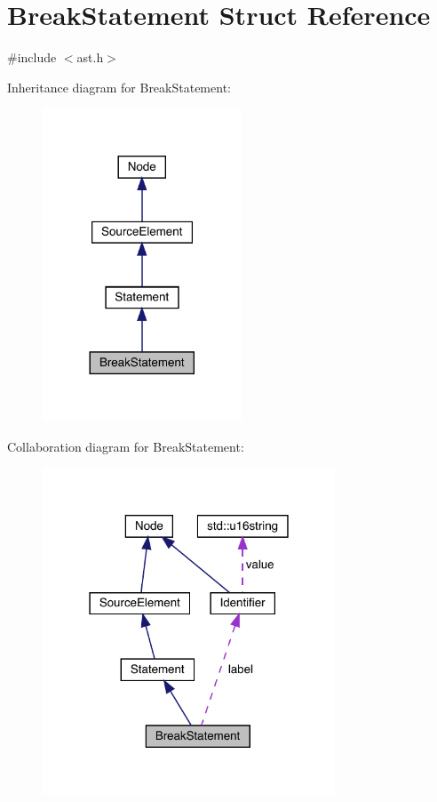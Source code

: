 \hypertarget{struct_break_statement}{}\section{Break\+Statement Struct Reference}
\label{struct_break_statement}


{\ttfamily \#include $<$ast.\+h$>$}



Inheritance diagram for Break\+Statement\+:\nopagebreak
\begin{figure}[H]
\begin{center}
\leavevmode
\includegraphics[width=168pt]{struct_break_statement__inherit__graph}
\end{center}
\end{figure}


Collaboration diagram for Break\+Statement\+:\nopagebreak
\begin{figure}[H]
\begin{center}
\leavevmode
\includegraphics[width=247pt]{struct_break_statement__coll__graph}
\end{center}
\end{figure}
